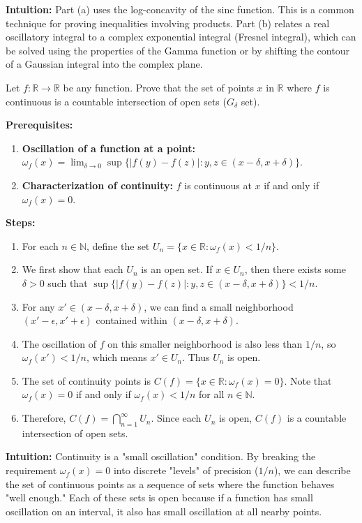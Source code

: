 \begin{solution}
\textbf{Intuition:}
Part (a) uses the log-concavity of the sinc function. This is a common technique for proving inequalities involving products.
Part (b) relates a real oscillatory integral to a complex exponential integral (Fresnel integral), which can be solved using the properties of the Gamma function or by shifting the contour of a Gaussian integral into the complex plane.
\end{solution}

\begin{exercise}
\label{analysis:2010:2}
Let $f: \mathbb{R} \to \mathbb{R}$ be any function. Prove that the set of points $x$ in $\mathbb{R}$ where $f$ is continuous is a countable intersection of open sets ($G_\delta$ set).
\end{exercise}

\begin{solution}
\textbf{Prerequisites:}
\begin{enumerate}
    \item \textbf{Oscillation of a function at a point:} $\omega_f(x) = \lim_{\delta \to 0} \sup \{ |f(y) - f(z)| : y, z \in (x-\delta, x+\delta) \}$.
    \item \textbf{Characterization of continuity:} $f$ is continuous at $x$ if and only if $\omega_f(x) = 0$.
\end{enumerate}

\textbf{Steps:}
\begin{enumerate}
    \item For each $n \in \mathbb{N}$, define the set $U_n = \{ x \in \mathbb{R} : \omega_f(x) < 1/n \}$.
    \item We first show that each $U_n$ is an open set.
       If $x \in U_n$, then there exists some $\delta > 0$ such that $\sup \{ |f(y) - f(z)| : y, z \in (x-\delta, x+\delta) \} < 1/n$.
    \item For any $x' \in (x-\delta, x+\delta)$, we can find a small neighborhood $(x'-\epsilon, x'+\epsilon)$ contained within $(x-\delta, x+\delta)$.
    \item The oscillation of $f$ on this smaller neighborhood is also less than $1/n$, so $\omega_f(x') < 1/n$, which means $x' \in U_n$. Thus $U_n$ is open.
    \item The set of continuity points is $C(f) = \{ x \in \mathbb{R} : \omega_f(x) = 0 \}$. Note that $\omega_f(x) = 0$ if and only if $\omega_f(x) < 1/n$ for all $n \in \mathbb{N}$.
    \item Therefore, $C(f) = \bigcap_{n=1}^\infty U_n$. Since each $U_n$ is open, $C(f)$ is a countable intersection of open sets.
\end{enumerate}

\textbf{Intuition:}
Continuity is a "small oscillation" condition. By breaking the requirement $\omega_f(x) = 0$ into discrete "levels" of precision ($1/n$), we can describe the set of continuous points as a sequence of sets where the function behaves "well enough." Each of these sets is open because if a function has small oscillation on an interval, it also has small oscillation at all nearby points.
\end{solution}

